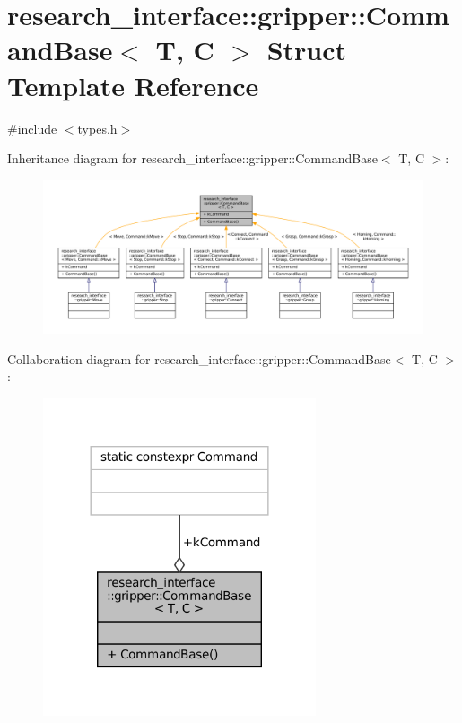 \hypertarget{structresearch__interface_1_1gripper_1_1CommandBase}{}\section{research\+\_\+interface\+:\+:gripper\+:\+:Command\+Base$<$ T, C $>$ Struct Template Reference}
\label{structresearch__interface_1_1gripper_1_1CommandBase}


{\ttfamily \#include $<$types.\+h$>$}



Inheritance diagram for research\+\_\+interface\+:\+:gripper\+:\+:Command\+Base$<$ T, C $>$\+:
\nopagebreak
\begin{figure}[H]
\begin{center}
\leavevmode
\includegraphics[width=350pt]{structresearch__interface_1_1gripper_1_1CommandBase__inherit__graph}
\end{center}
\end{figure}


Collaboration diagram for research\+\_\+interface\+:\+:gripper\+:\+:Command\+Base$<$ T, C $>$\+:
\nopagebreak
\begin{figure}[H]
\begin{center}
\leavevmode
\includegraphics[width=228pt]{structresearch__interface_1_1gripper_1_1CommandBase__coll__graph}
\end{center}
\end{figure}
